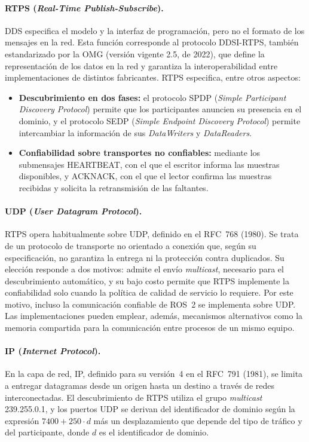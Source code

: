 \paragraph{RTPS (\textit{Real-Time Publish-Subscribe}).} DDS especifica el
modelo y la interfaz de programación, pero no el formato de los mensajes en la
red. Esta función corresponde al protocolo DDSI-RTPS, también estandarizado
por la OMG (versión vigente 2.5, de 2022), que define la representación de los
datos en la red y garantiza la interoperabilidad entre implementaciones de
distintos fabricantes. RTPS especifica, entre otros aspectos:
\begin{itemize}
    \item \textbf{Descubrimiento en dos fases:} el protocolo SPDP
    (\textit{Simple Participant Discovery Protocol}) permite que los
    participantes anuncien su presencia en el dominio, y el protocolo SEDP
    (\textit{Simple Endpoint Discovery Protocol}) permite intercambiar la
    información de sus \textit{DataWriters} y \textit{DataReaders}.
    \item \textbf{Confiabilidad sobre transportes no confiables:} mediante los
    submensajes HEARTBEAT, con el que el escritor informa las muestras
    disponibles, y ACKNACK, con el que el lector confirma las muestras
    recibidas y solicita la retransmisión de las faltantes.
\end{itemize}

\paragraph{UDP (\textit{User Datagram Protocol}).} RTPS opera habitualmente
sobre UDP, definido en el RFC~768 (1980). Se trata de un protocolo de
transporte no orientado a conexión que, según su especificación, no garantiza
la entrega ni la protección contra duplicados. Su elección responde a dos
motivos: admite el envío \textit{multicast}, necesario para el descubrimiento
automático, y su bajo costo permite que RTPS implemente la confiabilidad solo
cuando la política de calidad de servicio lo requiere. Por este motivo, incluso
la comunicación confiable de ROS~2 se implementa sobre UDP. Las implementaciones
pueden emplear, además, mecanismos alternativos como la memoria compartida para
la comunicación entre procesos de un mismo equipo.

\paragraph{IP (\textit{Internet Protocol}).} En la capa de red, IP, definido
para su versión~4 en el RFC~791 (1981), se limita a entregar datagramas desde
un origen hasta un destino a través de redes interconectadas. El
descubrimiento de RTPS utiliza el grupo \textit{multicast} 239.255.0.1, y los
puertos UDP se derivan del identificador de dominio según la expresión
$7400 + 250 \cdot d$ más un desplazamiento que depende del tipo de tráfico y del
participante, donde $d$ es el identificador de dominio.

